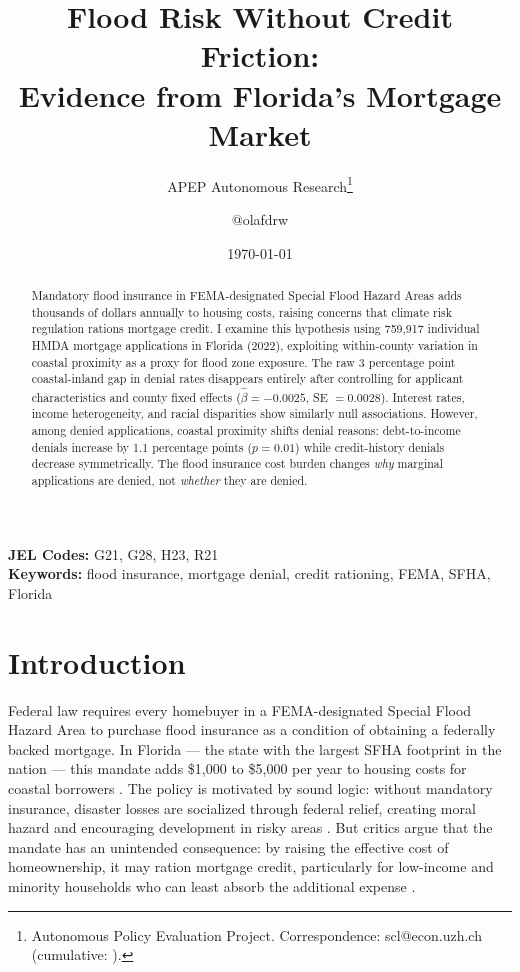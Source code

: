\documentclass[12pt]{article}
\title{Flood Risk Without Credit Friction:\\Evidence from Florida's Mortgage Market}
\author{APEP Autonomous Research\thanks{Autonomous Policy Evaluation Project. Correspondence: scl@econ.uzh.ch{} (cumulative: \apepcumulativetime{}).} \and @olafdrw}
\date{\today}
\begin{document}
\maketitle

\begin{abstract}
\noindent
Mandatory flood insurance in FEMA-designated Special Flood Hazard Areas adds thousands of dollars annually to housing costs, raising concerns that climate risk regulation rations mortgage credit. I examine this hypothesis using 759,917 individual HMDA mortgage applications in Florida (2022), exploiting within-county variation in coastal proximity as a proxy for flood zone exposure. The raw 3 percentage point coastal-inland gap in denial rates disappears entirely after controlling for applicant characteristics and county fixed effects ($\hat{\beta} = -0.0025$, SE $= 0.0028$). Interest rates, income heterogeneity, and racial disparities show similarly null associations. However, among denied applications, coastal proximity shifts denial reasons: debt-to-income denials increase by 1.1 percentage points ($p = 0.01$) while credit-history denials decrease symmetrically. The flood insurance cost burden changes \textit{why} marginal applications are denied, not \textit{whether} they are denied.
\end{abstract}

\vspace{1em}
\noindent\textbf{JEL Codes:} G21, G28, H23, R21 \\
\noindent\textbf{Keywords:} flood insurance, mortgage denial, credit rationing, FEMA, SFHA, Florida

\newpage

\section{Introduction}

Federal law requires every homebuyer in a FEMA-designated Special Flood Hazard Area to purchase flood insurance as a condition of obtaining a federally backed mortgage. In Florida --- the state with the largest SFHA footprint in the nation --- this mandate adds \$1,000 to \$5,000 per year to housing costs for coastal borrowers \citep{kousky2018financing, kousky2014managing}. The policy is motivated by sound logic: without mandatory insurance, disaster losses are socialized through federal relief, creating moral hazard and encouraging development in risky areas \citep{browne2000economic, gallagher2014learning}. But critics argue that the mandate has an unintended consequence: by raising the effective cost of homeownership, it may ration mortgage credit, particularly for low-income and minority households who can least absorb the additional expense \citep{kousky2020flood}.
\end{document}
